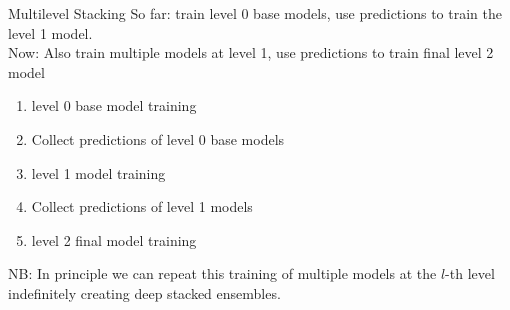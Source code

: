 \documentclass[10pt,compress,t,notes=noshow, xcolor=table]{beamer}
\begin{document}
\begin{vbframe}{Multilevel Stacking}
\vfill
So far: train level 0 base models, use predictions to train the level 1 model.\\
Now: Also train multiple models at level 1, use predictions to train final level 2 model 
\vfill
\begin{enumerate}
    \item level 0 base model training
    \item Collect predictions of level 0 base models
    \item level 1 model training 
    \item Collect predictions of level 1 models
    \item level 2 final model training
\end{enumerate}
\vfill
NB: In principle we can repeat this training of multiple models at the $l$-th level indefinitely creating deep stacked ensembles.
\vfill
\end{vbframe}

\end{document}
